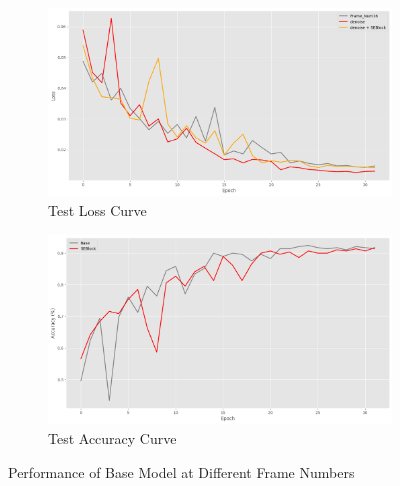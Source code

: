 \documentclass[conference]{IEEEtran}
\begin{document}
\begin{figure}[htbp]
    \begin{subfigure}[b]{0.24\textwidth}
        \centering
        \includegraphics[width=\textwidth]{figure/SE_test_losss.png}
        \caption{Test Loss Curve}
        \label{fig:sub3}
    \end{subfigure}
    \begin{subfigure}[b]{0.24\textwidth}
        \centering
        \includegraphics[width=\textwidth]{figure/SE_Test_acc.png}
        \caption{Test Accuracy Curve}
        \label{fig:sub4}
    \end{subfigure}
    \caption{Performance of Base Model at Different Frame Numbers}
    \label{fig:SE}
\end{figure}
\end{document}
